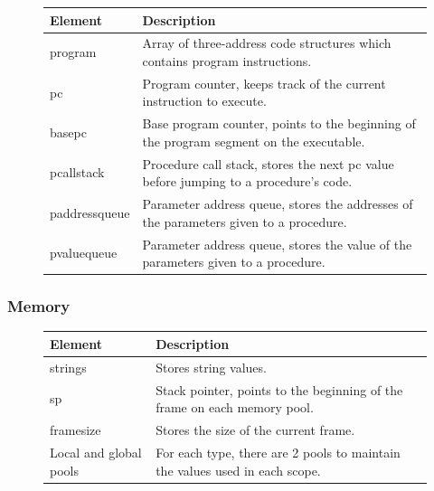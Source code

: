 \begin{figure}[h]
    \centering
    \begin{tabular}{p{1in}p{3in}}
        \toprule
        \textbf{Element} & \textbf{Description}\\
        \midrule program &
        Array of three-address code structures which contains \newline program
        instructions.\\

        \midrule pc &
        Program counter, keeps track of the current instruction to execute.\\

        \midrule basepc &
        Base program counter, points to the beginning of the program segment on
        the executable.\\

        \midrule pcallstack &
        Procedure call stack, stores the next pc value before jumping to a
        procedure's code.\\

        \midrule paddressqueue &
        Parameter address queue, stores the addresses of the parameters given
        to a procedure.\\

        \midrule pvaluequeue &
        Parameter address queue, stores the value of the parameters given
        to a procedure.\\

        \bottomrule
    \end{tabular}
\end{figure}

\subsubsection{Memory}

\begin{figure}[h]
    \centering
    \begin{tabular}{p{1in}p{3in}}
        \toprule
        \textbf{Element} & \textbf{Description}\\
        \midrule strings &
        Stores string values.\\
        
        \midrule sp &
        Stack pointer, points to the beginning of the frame on each memory
        pool.\\
        
        \midrule framesize &
        Stores the size of the current frame.\\
        
        \midrule Local and global \newline pools &
        For each type, there are 2 pools to maintain the values used in each
        scope.\\
        
        \bottomrule
    \end{tabular}
\end{figure}

